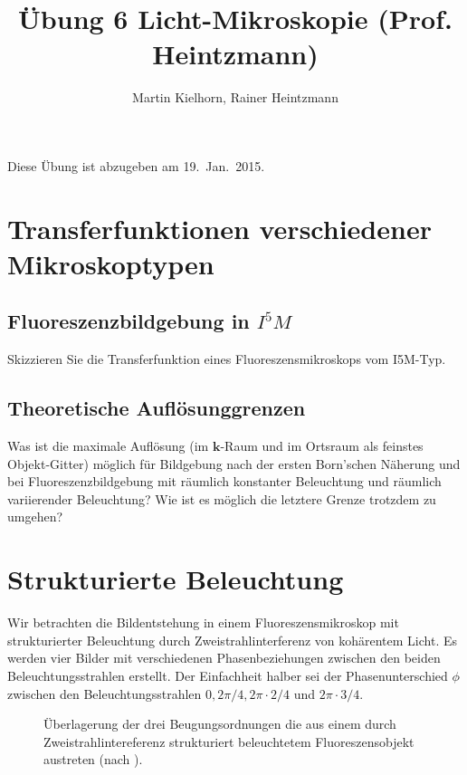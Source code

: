 \documentclass{article}
\begin{document}
\author{Martin Kielhorn, Rainer Heintzmann}
\title{\"Ubung 6 Licht-Mikroskopie (Prof. Heintzmann)}
\maketitle
\noindent Diese \"Ubung ist abzugeben am 19.~Jan.~2015.

\section{Transferfunktionen verschiedener Mikroskoptypen}
\subsection*{Fluoreszenzbildgebung in $I^5M$}
Skizzieren Sie die Transferfunktion eines Fluoreszensmikroskops vom I5M-Typ.

\subsection*{Theoretische Aufl\"osunggrenzen}

Was ist die maximale Aufl\"osung (im $\mathbf{k}$-Raum und im Ortsraum als feinstes Objekt-Gitter) m\"oglich f\"ur Bildgebung nach der ersten Born'schen Näherung und bei Fluoreszenzbildgebung mit räumlich konstanter Beleuchtung und räumlich variierender Beleuchtung? Wie ist es möglich die letztere Grenze trotzdem zu umgehen?


\section{Strukturierte Beleuchtung}

Wir betrachten die Bildentstehung in einem Fluoreszensmikroskop mit
strukturierter Beleuchtung durch Zweistrahlinterferenz von
koh\"arentem Licht. Es werden vier Bilder mit verschiedenen
Phasenbeziehungen zwischen den beiden Beleuchtungsstrahlen
erstellt. Der Einfachheit halber sei der Phasenunterschied $\phi$
zwischen den Beleuchtungsstrahlen $0, 2\pi/4, 2\pi\cdot 2/4$ und
$2\pi\cdot 3/4$.


\begin{figure}[htbp]
  \centering
  
  \caption{\"Uberlagerung der drei Beugungsordnungen die aus einem
    durch Zweistrahlintereferenz strukturiert beleuchtetem
    Fluoreszensobjekt austreten (nach
    \cite{heintzmann1999laterally}).}
  \label{fig:sim-mixing}
\end{figure}
\end{document}

